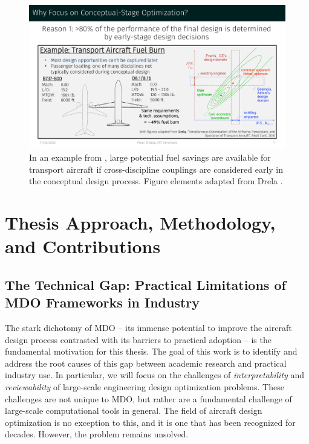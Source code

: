 \documentclass[12pt,vi,oneside]{report}
\begin{document}
    \begin{figure}[H]
        \centering
        \includegraphics[page=1,trim=1cm 1.3cm 1cm 5cm, clip, width=\textwidth]{../figures/motivation_for_conceptual_MDO_focus.pdf}
        \caption{In an example from \cite{drela_development_2011}, large potential fuel savings are available for transport aircraft if cross-discipline couplings are considered early in the conceptual design process. Figure elements adapted from Drela \cite{drela_simultaneous_2010}.}
        \label{fig:motivation_1a}
    \end{figure}


    \chapter{Thesis Approach, Methodology, and Contributions}
    \label{sec:approach}


    \section{The Technical Gap: Practical Limitations of MDO Frameworks in Industry}
    \label{sec:technical-gap}

    The stark dichotomy of MDO -- its immense potential to improve the aircraft design process contrasted with its barriers to practical adoption -- is the fundamental motivation for this thesis. The goal of this work is to identify and address the root causes of this gap between academic research and practical industry use. In particular, we will focus on the challenges of \textit{interpretability} and \textit{reviewability} of large-scale engineering design optimization problems. These challenges are not unique to MDO, but rather are a fundamental challenge of large-scale computational tools in general. The field of aircraft design optimization is no exception to this, and it is one that has been recognized for decades. However, the problem remains unsolved.
\end{document}
